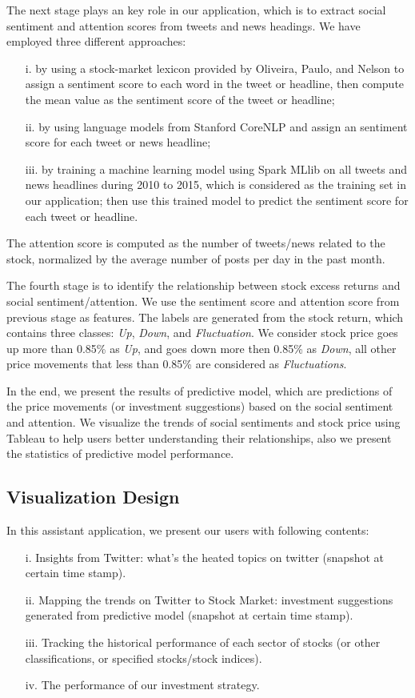 \documentclass[conference]{IEEEtran}
\begin{document}
The next stage plays an key role in our application, which is to extract social sentiment and attention scores from tweets and news headings. We have employed three different approaches: 
\begin{itemize}
    \item[i.] by using a stock-market lexicon provided by Oliveira, Paulo, and Nelson\cite{stocklexicon} to assign a sentiment score to each word in the tweet or headline, then compute the mean value as the sentiment score of the tweet or headline;
    \item[ii.] by using language models from Stanford CoreNLP \cite{StanfordNLP} and assign an sentiment score for each tweet or news headline;
    \item[iii.] by training a machine learning model using Spark MLlib on all tweets and news headlines during 2010 to 2015, which is considered as the training set in our application; then use this trained model to predict the sentiment score for each tweet or headline.
\end{itemize}
The attention score is computed as the number of tweets/news related to the stock, normalized by the average number of posts per day in the past month. 

The fourth stage is to identify the relationship between stock excess returns and social sentiment/attention. We use the sentiment score and attention score from previous stage as features. The labels are generated from the stock return, which contains three classes: \textit{Up}, \textit{Down}, and \textit{Fluctuation}. We consider stock price goes up more than 0.85\% as \textit{Up}, and goes down more then 0.85\% as \textit{Down}, all other price movements that less than 0.85\% are considered as \textit{Fluctuations}.

In the end, we present the results of predictive model, which are predictions of the price movements (or investment suggestions) based on the social sentiment and attention. We visualize the trends of social sentiments and stock price using Tableau to help users better understanding their relationships, also we present the statistics of predictive model performance.


\subsection{Visualization Design}
In this assistant application, we present our users with following contents:
\begin{itemize}
    \item[i.] Insights from Twitter: what’s the heated topics on twitter (snapshot at certain time stamp).
    \item[ii.] Mapping the trends on Twitter to Stock Market: investment suggestions generated from predictive model (snapshot at certain time stamp).
    \item[iii.] Tracking the historical performance of each sector of stocks (or other classifications, or specified stocks/stock indices).
    \item[iv.] The performance of our investment strategy.
\end{itemize}
\end{document}
